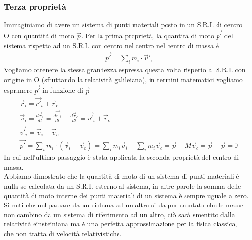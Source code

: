 \subsubsection{Terza proprietà}
Immaginiamo di avere un sistema di punti materiali posto in un S.R.I. di centro O con quantità di moto $\vec{p}$. Per la prima proprietà, la quantità di moto $\vec{p'}$ del sistema rispetto ad un S.R.I. con centro nel centro nel centro di massa è
\begin{align*}
&\vec{p'} = \sum_{i}m_i \cdot \vec{v}'_i
\end{align*}
Vogliamo ottenere la stessa grandezza espressa questa volta rispetto al S.R.I. con origine in O (sfruttando la relatività galileiana), in termini matematici vogliamo esprimere $\vec{p'}$ in funzione di $\vec{p}$\\
\begin{align*}
&\vec{r}_i =\vec{r'}_i+\vec{r}_c\\
&\vec{v}_i=\frac{d\vec{r}_i}{dt}=\frac{d\vec{r'}_i}{dt}+\frac{d\vec{r}_c}{dt}=\vec{v'}_i+\vec{v}_c\\
&\vec{v'}_i=\vec{v}_i-\vec{v}_c\\
&\vec{p'}=\sum_{i}m_i\cdot (\vec{v}_i-\vec{v}_c)= \sum_{i}m_i\vec{v}_i - \sum_{i}m_i\vec{v}_c = \vec{p} - M \vec{v}_c=\vec{p}-\vec{p}=0
\end{align*}
In cui nell'ultimo passaggio è stata applicata la seconda proprietà del centro di massa.\\
Abbiamo dimostrato che la quantità di moto di un sistema di punti materiali è nulla se calcolata da un S.R.I. esterno al sistema, in altre parole la somma delle quantità di moto interne dei punti materiali di un sistema è sempre uguale a zero.
Si noti che nel passare da un sistema ad un altro si da per scontato che le masse non cambino da un sistema di riferimento ad un altro, ciò sarà smentito dalla relatività einsteiniana ma è una perfetta approssimazione per la fisica classica, che non tratta di velocità relativistiche.\\
